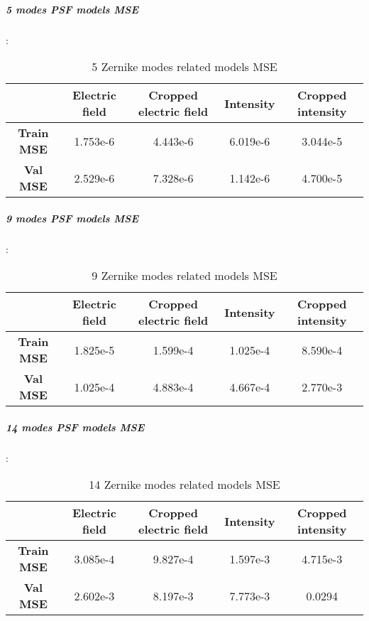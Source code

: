 		\subparagraph{5 modes PSF models MSE}:\\
		\begin{table}[h!]
			\centering
			\begin{tabular}{|c|c|c|c|c|}
				\hline
				  & \textbf{Electric field} & \textbf{Cropped electric field} & \textbf{Intensity} & \textbf{Cropped intensity}\\
				\hline
				\textbf{Train MSE} & 1.753e-6 & 4.443e-6 & 6.019e-6 & 3.044e-5\\
				\hline
				\textbf{Val MSE} & 2.529e-6 & 7.328e-6 & 1.142e-6 & 4.700e-5\\
				\hline
			\end{tabular}
		\caption{5 Zernike modes related models MSE}
		\end{table}
		\FloatBarrier
		
		\subparagraph{9 modes PSF models MSE}:\\
		\begin{table}[h!]
			\centering
			\begin{tabular}{|c|c|c|c|c|}
				\hline
				  & \textbf{Electric field} & \textbf{Cropped electric field} & \textbf{Intensity} & \textbf{Cropped intensity}\\
				\hline
				\textbf{Train MSE} & 1.825e-5 & 1.599e-4 & 1.025e-4 & 8.590e-4\\
				\hline
				\textbf{Val MSE} & 1.025e-4 & 4.883e-4 & 4.667e-4 & 2.770e-3\\
				\hline
			\end{tabular}
		\caption{9 Zernike modes related models MSE}
		\end{table}
		\FloatBarrier
		
		\subparagraph{14 modes PSF models MSE}:\\
		\begin{table}[h!]
			\centering
			\begin{tabular}{|c|c|c|c|c|}
				\hline
				  & \textbf{Electric field} & \textbf{Cropped electric field} & \textbf{Intensity} & \textbf{Cropped intensity}\\
				\hline
				\textbf{Train MSE} & 3.085e-4 & 9.827e-4 & 1.597e-3 & 4.715e-3\\
				\hline
				\textbf{Val MSE} & 2.602e-3 & 8.197e-3 & 7.773e-3 & 0.0294\\
				\hline
			\end{tabular}
		\caption{14 Zernike modes related models MSE}
		\end{table}
		\FloatBarrier
		

